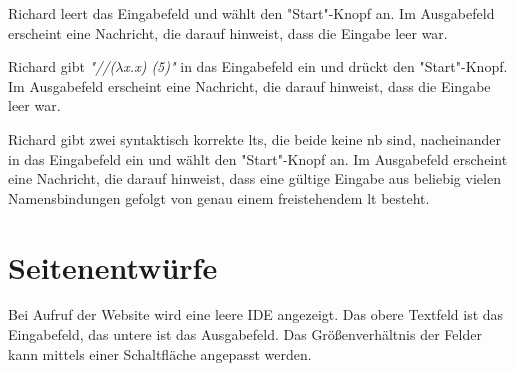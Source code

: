 \documentclass[parskip=full,11pt,twoside]{scrartcl}
\begin{document}
{Richard leert das Eingabefeld und wählt den "Start"-Knopf an.}
{Im Ausgabefeld erscheint eine Nachricht, die darauf hinweist, dass die Eingabe leer war.}

{Richard gibt \emph{"//($\lambda$x.x) (5)"} in das Eingabefeld ein und drückt den "Start"-Knopf.}
{Im Ausgabefeld erscheint eine Nachricht, die darauf hinweist, dass die Eingabe leer war.}

{Richard gibt zwei syntaktisch korrekte \glspl{lt}, die beide keine \gls{nb} sind, nacheinander
in das Eingabefeld ein und wählt den "Start"-Knopf an.}
{Im Ausgabefeld erscheint eine Nachricht, die darauf hinweist, dass eine gültige Eingabe
aus beliebig vielen Namensbindungen gefolgt von genau einem freistehendem \gls{lt} besteht.}
%
%
%

\pagebreak
\appendix

\section{Seitenentwürfe}


Bei Aufruf der Website wird eine leere IDE angezeigt. Das obere Textfeld ist das Eingabefeld, das untere ist das Ausgabefeld. Das Größenverhältnis der Felder kann mittels einer Schaltfläche angepasst werden.
\end{document}
